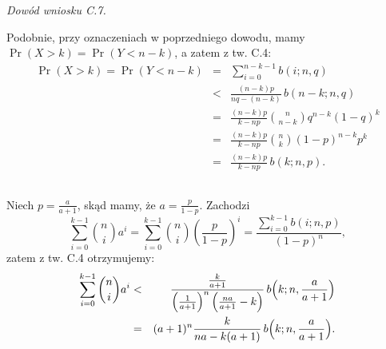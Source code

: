 \noindent\emph{Dowód wniosku C.7.}

\noindent Podobnie, przy oznaczeniach w poprzedniego dowodu, mamy $\Pr(X>k)=\Pr(Y<n-k)$, a zatem z tw. C.4:
\begin{eqnarray*}
	\Pr(X>k) = \Pr(Y<n-k) &=& \sum_{i=0}^{n-k-1}b(i;n,q) \\
	&<& \frac{(n-k)p}{nq-(n-k)}\,b(n-k;n,q) \\
	&=& \frac{(n-k)p}{k-np}\binom{n}{n-k}q^{n-k}(1-q)^k \\
	&=& \frac{(n-k)p}{k-np}\binom{n}{k}(1-p)^{n-k}p^k \\
	&=& \frac{(n-k)p}{k-np}\,b(k;n,p).
\end{eqnarray*}

\subsection{} %
Niech $p=\frac{a}{a+1}$, skąd mamy, że $a=\frac{p}{1-p}$. Zachodzi
\[
	\sum_{i=0}^{k-1}\binom{n}{i}a^i = \sum_{i=0}^{k-1}\binom{n}{i}\left(\frac{p}{1-p}\right)^i = \frac{\sum_{i=0}^{k-1}b(i;n,p)}{(1-p)^n},
\]
zatem z tw. C.4 otrzymujemy:
\begin{eqnarray*}
	\sum_{i=0}^{k-1}\binom{n}{i}a^i &<& \frac{\frac{k}{a+1}}{\left(\frac{1}{a+1}\right)^n\left(\frac{na}{a+1}-k\right)}\,b\Bigl(k;n,\frac{a}{a+1}\Bigr) \\
	&=& (a+1)^n\frac{k}{na-k(a+1)}\,b\Bigl(k;n,\frac{a}{a+1}\Bigr).
\end{eqnarray*}

\subsection{} %
